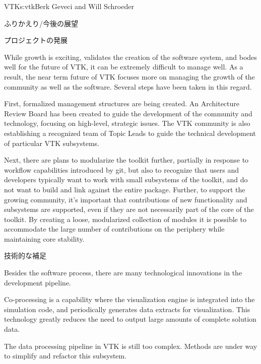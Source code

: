 \begin{aosachapter}{VTK}{s:vtk}{Berk Geveci and Will Schroeder}
\begin{aosasect1}{ふりかえり/今後の展望}
\begin{aosasect2}{プロジェクトの発展}
\begin{aosaitemize}
\end{aosaitemize}

While growth is exciting, validates the creation of the software
system, and bodes well for the future of VTK, it can be extremely
difficult to manage well. As a result, the near term future of VTK
focuses more on managing the growth of the community as well as the
software. Several steps have been taken in this regard.

First, formalized management structures are being created. An
Architecture Review Board has been created to guide the development of
the community and technology, focusing on high-level, strategic
issues. The VTK community is also establishing a recognized team of
Topic Leads to guide the technical development of particular VTK
subsystems.

Next, there are plans to modularize the toolkit further, partially in
response to workflow capabilities introduced by git, but also to
recognize that users and developers typically want to work with small
subsystems of the toolkit, and do not want to build and link against
the entire package. Further, to support the growing community, it's
important that contributions of new functionality and subsystems are
supported, even if they are not necessarily part of the core of the
toolkit. By creating a loose, modularized collection of modules it is
possible to accommodate the large number of contributions on the
periphery while maintaining core stability.

\end{aosasect2}

\begin{aosasect2}{技術的な補足}

Besides the software process, there are many technological innovations
in the development pipeline.

\begin{aosaitemize}

  \item Co-processing is a capability where the visualization engine is
  integrated into the simulation code, and periodically generates data
  extracts for visualization. This technology greatly reduces the need
  to output large amounts of complete solution data.

  \item The data processing pipeline in VTK is still too
  complex. Methods are under way to simplify and refactor this
  subsystem.


\end{aosaitemize}
\end{aosasect2}
\end{aosasect1}
\end{aosachapter}

